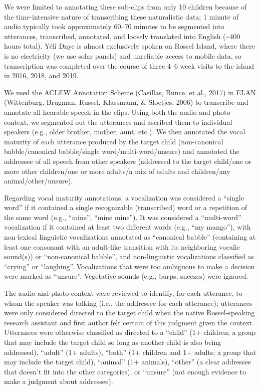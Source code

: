 \documentclass[
  english,
  ,man,floatsintext]{apa6}
\begin{document}
We were limited to annotating these sub-clips from only 10 children because of the time-intensive nature of transcribing these naturalistic data; 1 minute of audio typically took approximately 60--70 minutes to be segmented into utterances, transcribed, annotated, and loosely translated into English (\textasciitilde400 hours total). Yélî Dnye is almost exclusively spoken on Rossel Island, where there is no electricity (we use solar panels) and unreliable access to mobile data, so transcription was completed over the course of three 4--6 week visits to the island in 2016, 2018, and 2019.

We used the ACLEW Annotation Scheme (Casillas, Bunce, et al., 2017) in ELAN (Wittenburg, Brugman, Russel, Klassmann, \& Sloetjes, 2006) to transcribe and annotate all hearable speech in the clips. Using both the audio and photo context, we segmented out the utterances and ascribed them to individual speakers (e.g., older brother, mother, aunt, etc.). We then annotated the vocal maturity of each utterance produced by the target child (non-canonical babble/canonical babble/single word/multi-word/unsure) and annotated the addressee of all speech from other speakers (addressed to the target child/one or more other children/one or more adults/a mix of adults and children/any animal/other/unsure).

Regarding vocal maturity annotations, a vocalization was considered a \enquote{single word} if it contained a single recognizable (transcribed) word or a repetition of the same word (e.g., \enquote{mine}, \enquote{mine mine}). It was considered a \enquote{multi-word} vocalization if it contained at least two different words (e.g., \enquote{my mango}), with non-lexical linguistic vocalizations annotated as \enquote{canonical babble} (containing at least one consonant with an adult-like transition with its neighboring vocalic sound(s)) or \enquote{non-canonical babble}, and non-linguistic vocalizations classified as \enquote{crying} or \enquote{laughing}. Vocalizations that were too ambiguous to make a decision were marked as \enquote{unsure}. Vegetative sounds (e.g., burps, sneezes) were ignored.

The audio and photo context were reviewed to identify, for each utterance, to whom the speaker was talking (i.e., the addressee for each utterance); utterances were only considered directed to the target child when the native Rossel-speaking research assistant and first author felt certain of this judgment given the context. Utterances were otherwise classified as directed to a \enquote{child} (1+ children; a group that may include the target child so long as another child is also being addressed), \enquote{adult} (1+ adults), \enquote{both} (1+ children and 1+ adults; a group that may include the target child), \enquote{animal} (1+ animals), \enquote{other} (a clear addressee that doesn't fit into the other categories), or \enquote{unsure} (not enough evidence to make a judgment about addressee).
\end{document}
